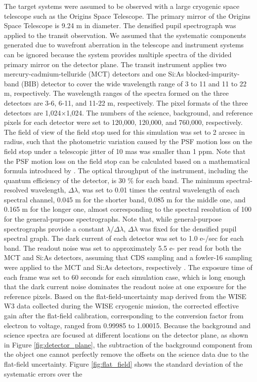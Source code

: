 \documentclass{aastex62}
\begin{document}
The target systems were assumed to be observed with a large cryogenic space telescope such as the Origins Space Telescope. The primary mirror of the Origins Space Telescope is 9.24 m in diameter. The densified pupil spectrograph was applied to the transit observation. We assumed that the systematic components generated due to wavefront aberration in the telescope and instrument systems can be ignored because the system provides multiple spectra of the divided primary mirror on the detector plane. The transit instrument applies two mercury-cadmium-telluride (MCT) detectors \citep[e.g.,][]{2013SPIE.1306..6978} and one Si:As blocked-impurity-band (BIB) detector \citep[e.g.,][]{2015PASP..127..665R, 2015PASP..127..675R} to cover the wide wavelength range of 3 to 11 and 11 to 22 \textmu m, respectively. The wavelength ranges of the spectra formed on the three detectors are 3-6, 6-11, and 11-22 \textmu m, respectively. The pixel formats of the three detectors are 1,024$\times$1,024. The numbers of the science, background, and reference pixels for each detector were set to 120,000, 120,000, and 760,000, respectively. The field of view of the field stop used for this simulation was set to 2 arcsec in radius, such that the photometric variation caused by the PSF motion loss on the field stop under a telescopic jitter of 10 mas was smaller than 1 ppm. Note that the PSF motion loss on the field stop can be calculated based on a mathematical formula introduced by \cite{2017AJ....154...97I}. The optical throughput of the instrument, including the quantum efficiency of the detector, is 30 \% for each band. The minimum spectral-resolved wavelength, ${\Delta}{\lambda}$, was set to 0.01 times the central wavelength of each spectral channel, 0.045 \textmu m for the shorter band, 0.085 \textmu m for the middle one, and 0.165 \textmu m for the longer one, almost corresponding to the spectral resolution of 100 for the general-purpose spectrographs. Note that, while general-purpose spectrographs provide a constant ${\lambda}/{\Delta}{\lambda}$, ${\Delta}{\lambda}$ was fixed for the densified pupil spectral graph. The dark current of each detector was set to 1.0 e-/sec for each band. The readout noise was set to approximately 5.5 e- per read for both the MCT and Si:As detectors, assuming that CDS sampling and a fowler-16 sampling were applied to the MCT and Si:As detectors, respectively \citep[e.g.,][]{2014PASP..126..739R, 2015PASP..127.1144R}. The exposure time of each frame was set to 60 seconds for each simulation case, which is long enough that the dark current noise dominates the readout noise at one exposure for the reference pixels. Based on the flat-field-uncertainty map derived from the WISE W3 data collected during the WISE cryogenic mission, the corrected effective gain after the flat-field calibration, corresponding to the conversion factor from electron to voltage, ranged from 0.99985 to 1.00015. Because the background and science spectra are focused at different locations on the detector plane, as shown in Figure \ref{fig:detector_plane}, the subtraction of the background component from the object one cannot perfectly remove the offsets on the science data due to the flat-field uncertainty. Figure \ref{fig:flat_field} shows the standard deviation of the systematic errors over the 
\end{document}
